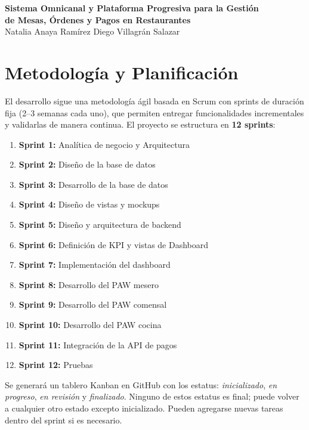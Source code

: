 \documentclass[10pt]{article}
\begin{document}
\begin{center}
  {\bfseries\fontsize{11}{13}\selectfont
  Sistema Omnicanal y Plataforma Progresiva para la Gestión\\
  de Mesas, Órdenes y Pagos en Restaurantes}\\[4pt]
  {\fontsize{9}{11}\selectfont
  Natalia Anaya Ramírez \quad Diego Villagrán Salazar}
\end{center}

\vspace{6pt}

\section{Metodología y Planificación}

El desarrollo sigue una metodología ágil basada en Scrum con sprints de duración fija (2--3 semanas cada uno), que permiten entregar funcionalidades incrementales y validarlas de manera continua. El proyecto se estructura en \textbf{12 sprints}:

\begin{enumerate}[leftmargin=*, itemsep=1pt, topsep=2pt]
  \item \textbf{Sprint 1:} Analítica de negocio y Arquitectura
  \item \textbf{Sprint 2:} Diseño de la base de datos
  \item \textbf{Sprint 3:} Desarrollo de la base de datos
  \item \textbf{Sprint 4:} Diseño de vistas y mockups
  \item \textbf{Sprint 5:} Diseño y arquitectura de backend
  \item \textbf{Sprint 6:} Definición de KPI y vistas de Dashboard
  \item \textbf{Sprint 7:} Implementación del dashboard
  \item \textbf{Sprint 8:} Desarrollo del PAW mesero
  \item \textbf{Sprint 9:} Desarrollo del PAW comensal
  \item \textbf{Sprint 10:} Desarrollo del PAW cocina
  \item \textbf{Sprint 11:} Integración de la API de pagos
  \item \textbf{Sprint 12:} Pruebas
\end{enumerate}

Se generará un tablero Kanban en GitHub con los estatus: \emph{inicializado}, \emph{en progreso}, \emph{en revisión} y \emph{finalizado}. Ninguno de estos estatus es final; puede volver a cualquier otro estado excepto inicializado. Pueden agregarse nuevas tareas dentro del sprint si es necesario.
\end{document}
